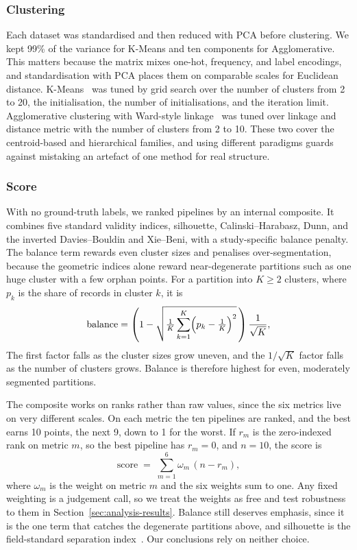 \documentclass[conference]{IEEEtran}
\begin{document}
\subsubsection{Clustering}
Each dataset was standardised and then reduced with PCA before clustering. We kept 99\% of the variance for K-Means and ten components for Agglomerative. This matters because the matrix mixes one-hot, frequency, and label encodings, and standardisation with PCA places them on comparable scales for Euclidean distance. K-Means~\cite{macqueen1967kmeans} was tuned by grid search over the number of clusters from 2 to 20, the initialisation, the number of initialisations, and the iteration limit. Agglomerative clustering with Ward-style linkage~\cite{ward1963hierarchical} was tuned over linkage and distance metric with the number of clusters from 2 to 10. These two cover the centroid-based and hierarchical families, and using different paradigms guards against mistaking an artefact of one method for real structure.

\subsubsection{Score}
With no ground-truth labels, we ranked pipelines by an internal composite. It combines five standard validity indices, silhouette, Calinski--Harabasz, Dunn, and the inverted Davies--Bouldin and Xie--Beni, with a study-specific balance penalty. The balance term rewards even cluster sizes and penalises over-segmentation, because the geometric indices alone reward near-degenerate partitions such as one huge cluster with a few orphan points. For a partition into $K\geq2$ clusters, where $p_k$ is the share of records in cluster $k$, it is
\begin{equation}\label{eq:balance}
\text{balance} = \left(1 - \sqrt{\tfrac{1}{K}\sum_{k=1}^{K}\Bigl(p_k - \tfrac{1}{K}\Bigr)^{2}}\,\right)\frac{1}{\sqrt{K}},
\end{equation}
The first factor falls as the cluster sizes grow uneven, and the $1/\sqrt{K}$ factor falls as the number of clusters grows. Balance is therefore highest for even, moderately segmented partitions.

The composite works on ranks rather than raw values, since the six metrics live on very different scales. On each metric the ten pipelines are ranked, and the best earns 10 points, the next 9, down to 1 for the worst. If $r_m$ is the zero-indexed rank on metric $m$, so the best pipeline has $r_m=0$, and $n=10$, the score is
\begin{equation}\label{eq:composite}
\text{score} \;=\; \sum_{m=1}^{6} \omega_m \,(n - r_m),
\end{equation}
where $\omega_m$ is the weight on metric $m$ and the six weights sum to one. Any fixed weighting is a judgement call, so we treat the weights as free and test robustness to them in Section~\ref{sec:analysis-results}. Balance still deserves emphasis, since it is the one term that catches the degenerate partitions above, and silhouette is the field-standard separation index~\cite{chicco2025silhouette}. Our conclusions rely on neither choice.
\end{document}
